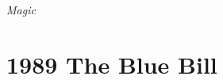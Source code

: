 \documentclass[
  ebook,
  10pt,
  oneside,
]{memoir}
\author{Justin Musgrove}
\title{\mybookname}
\date{Rev \today}
\makeatletter
\def\maketitle{%
  \null
  \thispagestyle{empty}%
  \vfill
  \begin{center}\leavevmode
    \normalfont
    {\LARGE\raggedleft \@author\par}%
    \hrulefill\par
    {\huge\raggedright \@title\par}%
    \vskip 1cm
  \end{center}%
  \vfill
  \null
  \cleardoublepage
  }
\makeatother
\begin{document}
\let\cleardoublepage\clearpage
\maketitle
\frontmatter
\null\vfill
\begin{flushleft}
\textit{Magic}
\end{flushleft}
\let\cleardoublepage\clearpage
\mainmatter
\sloppy

\chapter{1989 The Blue Bill}
\lipsum[1-5]
\end{document}
